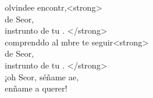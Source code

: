 \begin{cancion}
	olvindee encontr,<strong> \\
	 de  Seor,\\
	instrunto de tu . </strong>\\
	comprenddo al mbre  te seguir<strong>\\
	 de  Seor,\\
	instrunto de tu . </strong>\\
	¡oh Seor, séñame ae,\\
	enñame a querer!  \\
\end{cancion}%

